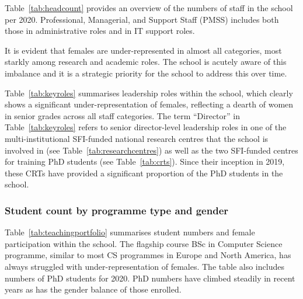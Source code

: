 Table~\ref{tab:headcount} provides an overview of the numbers of staff in the school per 2020. 
Professional, Managerial, and Support Staff (PMSS) includes 
both those in administrative roles and in IT support roles.  
%

%
It is evident 
that females are under-represented in almost all categories, most 
starkly among research and  academic roles. The school is acutely 
aware of this imbalance  and it is a strategic priority for the 
school to address this over time.

Table~\ref{tab:keyroles} summarises leadership roles
within the school, which clearly shows a significant under-representation of females, reflecting a dearth of women in senior grades across all staff categories. 
The term ``Director'' in Table~\ref{tab:keyroles} refers to senior
director-level leadership roles in one of the multi-institutional 
SFI-funded national research centres that the school is involved in (see Table~\ref{tab:researchcentres}) as well as the two SFI-funded centres for training PhD students (see Table~\ref{tab:crts}). 
Since their inception in 2019, these CRTs have provided a 
significant proportion of the PhD students in the school.





\subsubsection{Student count by programme type and gender}

Table~\ref{tab:teachingportfolio} summarises student numbers and female participation within the school. 
%
%
The flagship course BSc in Computer Science programme,
similar to most CS programmes in Europe and North America,
has always struggled with under-representation of females. 
The table also includes numbers
of PhD students for 2020. PhD numbers have climbed steadily 
in recent years as has the gender balance of those enrolled.


